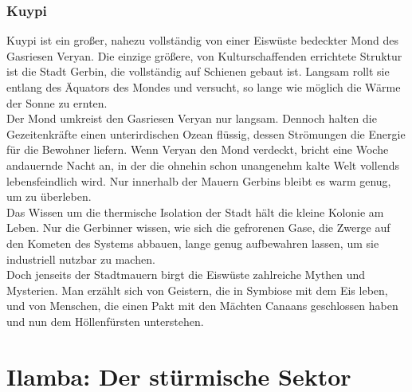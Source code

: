 \documentclass{book}
\begin{document}
    \subsection{Kuypi}
    Kuypi ist ein großer, nahezu vollständig von einer Eiswüste bedeckter Mond des Gasriesen Veryan. Die einzige größere, von Kulturschaffenden errichtete Struktur ist die Stadt Gerbin, die vollständig auf Schienen gebaut ist. Langsam rollt sie entlang des Äquators des Mondes und versucht, so lange wie möglich die Wärme der Sonne zu ernten.\\
    Der Mond umkreist den Gasriesen Veryan nur langsam. Dennoch halten die Gezeitenkräfte einen unterirdischen Ozean flüssig, dessen Strömungen die Energie für die Bewohner liefern. Wenn Veryan den Mond verdeckt, bricht eine Woche andauernde Nacht an, in der die ohnehin schon unangenehm kalte Welt vollends lebensfeindlich wird. Nur innerhalb der Mauern Gerbins bleibt es warm genug, um zu überleben.\\
    Das Wissen um die thermische Isolation der Stadt hält die kleine Kolonie am Leben. Nur die Gerbinner wissen, wie sich die gefrorenen Gase, die Zwerge auf den Kometen des Systems abbauen, lange genug aufbewahren lassen, um sie industriell nutzbar zu machen.\\
    Doch jenseits der Stadtmauern birgt die Eiswüste zahlreiche Mythen und Mysterien. Man erzählt sich von Geistern, die in Symbiose mit dem Eis leben, und von Menschen, die einen Pakt mit den Mächten Canaans geschlossen haben und nun dem Höllenfürsten unterstehen.

\chapter{Ilamba: Der stürmische Sektor}
\end{document}
